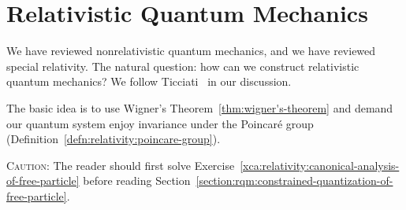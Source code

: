 \chapter{Relativistic Quantum Mechanics}

\M
We have reviewed nonrelativistic quantum mechanics, and we have
reviewed special relativity. The natural question: how can we construct
relativistic quantum mechanics? We follow
Ticciati~\cite{Ticciati:1999qp} in our discussion.

The basic idea is to use Wigner's Theorem~\ref{thm:wigner's-theorem}
and demand our quantum system enjoy invariance under the Poincar\'e group
(Definition~\ref{defn:relativity:poincare-group}).

\textsc{Caution:}
The reader should first solve
Exercise~\ref{xca:relativity:canonical-analysis-of-free-particle} before
reading Section~\ref{section:rqm:constrained-quantization-of-free-particle}.






